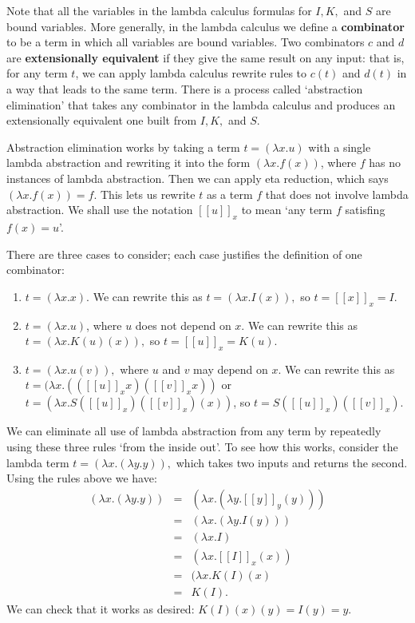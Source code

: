 \documentclass[12pt,twoside,openright]{report}
\begin{document}
Note that all the variables in the lambda calculus formulas for $I, K,$ and $S$ are bound variables.  More generally, in the lambda calculus we define a {\bf combinator} to be a term in which all variables are bound variables.  Two combinators $c$ and $d$ are {\bf extensionally equivalent} if they give the same result on any input:
that is, for any term $t$, we can apply lambda calculus rewrite rules to $c(t)$ and $d(t)$ in a way that leads to the same term.  There is a process called `abstraction elimination' that takes any combinator in the lambda calculus and produces an extensionally equivalent one built from $I, K,$ and $S$.

Abstraction elimination works by taking a term $t = (\lambda x.u)$
with a single lambda abstraction and rewriting it into the form
$(\lambda x.f(x))$, where $f$ has no instances of lambda abstraction. Then we can apply eta reduction, which says $(\lambda x. f(x)) = f$. This lets us rewrite $t$ as a term $f$ that does not involve lambda abstraction.  We shall use the notation $[[u]]_x$ to mean `any term
$f$ satisfing $f(x) = u$'.

There are three cases to consider; each case justifies the definition of one combinator:
\begin{enumerate}
  \item $t = (\lambda x.x)$. 
    We can rewrite this as $t = (\lambda x.I(x)),$ so $t = [[x]]_x = I$.  
  \item $t = (\lambda x. u)$, where $u$ does not depend on $x$.
    We can rewrite this as $t = (\lambda x. K(u)(x)),$ so 
   $t = [[u]]_x = K(u).$
  \item $t = (\lambda x. u(v)),$ where $u$ and $v$ may depend
    on $x$.  We can rewrite this as 
    $t = (\lambda x.(([[u]]_x x) ([[v]]_x x))$ or
    $t = (\lambda x. S([[u]]_x)([[v]]_x)(x))$, so $t = S([[u]]_x)([[v]]_x).$
\end{enumerate}

We can eliminate all use of lambda abstraction from any term by repeatedly using these three rules `from the inside out'.  To see how this works, consider the lambda term $t = (\lambda x. (\lambda y. y)),$ which takes two inputs and returns the second. Using the rules above we have:
\[
\begin{array}{ccl}
  (\lambda x. (\lambda y.y)) 
    &=& (\lambda x. (\lambda y. [[y]]_y(y))) \\
    &=& (\lambda x. (\lambda y. I(y))) \\
    &=& (\lambda x.I) \\
    &=& (\lambda x. [[I]]_x(x)) \\
    &=& (\lambda x. K(I)(x) \\
    &=& K(I) .
\end{array}
\]
We can check that it works as desired: $K(I)(x)(y) = I(y) = y.$  
\end{document}
